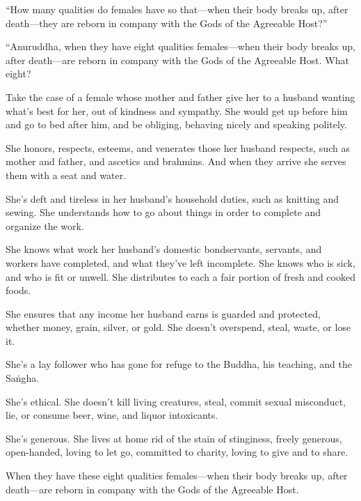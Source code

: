 \documentclass[12pt,openany]{book}%
\begin{document}
“How many qualities do females have so that—when their body breaks up, after death—they are reborn in company with the Gods of the Agreeable Host?” 

“Anuruddha, when they have eight qualities females—when their body breaks up, after death—are reborn in company with the Gods of the Agreeable Host. What eight? 

Take the case of a female whose mother and father give her to a husband wanting what’s best for her, out of kindness and sympathy. She would get up before him and go to bed after him, and be obliging, behaving nicely and speaking politely. 

She honors, respects, esteems, and venerates those her husband respects, such as mother and father, and ascetics and brahmins. And when they arrive she serves them with a seat and water. 

She’s deft and tireless in her husband’s household duties, such as knitting and sewing. She understands how to go about things in order to complete and organize the work. 

She knows what work her husband’s domestic bondservants, servants, and workers have completed, and what they’ve left incomplete. She knows who is sick, and who is fit or unwell. She distributes to each a fair portion of fresh and cooked foods. 

She ensures that any income her husband earns is guarded and protected, whether money, grain, silver, or gold. She doesn’t overspend, steal, waste, or lose it. 

She’s a lay follower who has gone for refuge to the Buddha, his teaching, and the \textsanskrit{Saṅgha}. 

She’s ethical. She doesn’t kill living creatures, steal, commit sexual misconduct, lie, or consume beer, wine, and liquor intoxicants. 

She’s generous. She lives at home rid of the stain of stinginess, freely generous, open-handed, loving to let go, committed to charity, loving to give and to share. 

When they have these eight qualities females—when their body breaks up, after death—are reborn in company with the Gods of the Agreeable Host. 
\end{document}
